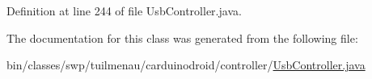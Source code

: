 Definition at line 244 of file Usb\+Controller.\+java.



The documentation for this class was generated from the following file\+:\begin{DoxyCompactItemize}
\item 
bin/classes/swp/tuilmenau/carduinodroid/controller/\hyperlink{bin_2classes_2swp_2tuilmenau_2carduinodroid_2controller_2_usb_controller_8java}{Usb\+Controller.\+java}\end{DoxyCompactItemize}
